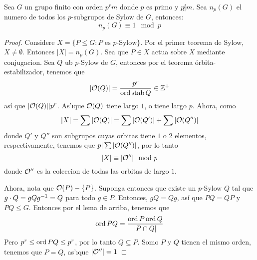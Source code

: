 \begin{theorem}\label{8.36}
    Sea $G$ un grupo finito con orden  $p^rm$ donde $p$ es primo y $p \not| m$.
    Sea  $n_p(G)$ el numero de todos los $p$-subgrupos de Sylow de $G$,
    entonces:
    \begin{equation*}
        n_p(G) \equiv 1 \mod{p}
    \end{equation*}
\end{theorem}
\begin{proof}
    Considere $X=\{P \leq G : P \text{ es } p \text{-Sylow}\}$. Por el primer
    teorema de Sylow, $X \neq \emptyset$. Entonces $|X|=n_p(G)$. Sea que $P \in X$
    actua sobre  $X$ mediante conjugacion. Sea $Q$ ub  $p$-Sylow de  $G$,
    entonces por el teorema \'orbita-estabilizador, tenemos que
    \begin{equation*}
    |\mathcal{O}(Q)|=\frac{p^r}{\operatorname{ord}{\operatorname{stab}{Q}}} \in \mathbb{Z}^+
    \end{equation*}
    as\'i que $|\mathcal{O}(Q)||p^r$. As'\i que $\mathcal{O}(Q)$ tiene largo $1$, o tiene largo
     $p$. Ahora, como
     \begin{equation*}
         |X|=\sum{|\mathcal{O}(Q)|}=\sum{|\mathcal{O}(Q')|}+\sum{|\mathcal{O}(Q'')|}
     \end{equation*}
     donde $Q'$ y  $Q''$ son subgrupos cuyas orbitas tiene $1$ o  $2$ elementos,
     respectivamente, tenemos que  $p|\sum{|\mathcal{O}(Q'')|}$, por lo tanto
     \begin{equation*}
         |X| \equiv |\mathcal{O}''| \mod{p}
     \end{equation*}
     donde $\mathcal{O}''$ es la coleccion de todas las orbitas de largo $1$.

     Ahora, nota que $\mathcal{O}(P)-\{P\}$. Suponga entonces que existe un $p$-Sylow
     $Q$ tal que  $g \cdot Q=gQg^{-1}=Q$ para todo $g \in P$. Entonces,
     $gQ=Qg$, as\'i que  $PQ=QP$ y  $PQ \leq G$. Entonces por el lema de arriba,
     tenemos que
     \begin{equation*}
         \operatorname{ord}{PQ}=\frac{\operatorname{ord}{P}\operatorname{ord}{Q}}{|P \cap Q|}
     \end{equation*}
     Pero $p^r \leq \operatorname{ord}{PQ} \leq p^r$, por lo tanto $Q \subseteq P$. Somo  $P$
     y  $Q$ tienen el mismo orden, tenemos que  $P=Q$, as'\i que  $|\mathcal{O}''|=1$
\end{proof}

